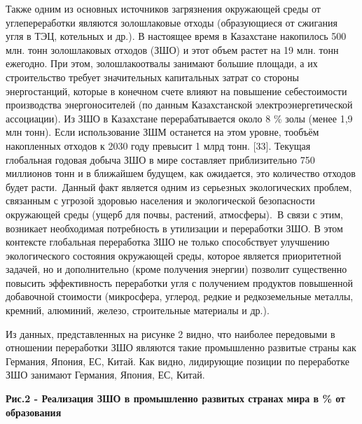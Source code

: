 \begin{multicols}{2}
Также одним из основных источников загрязнения окружающей среды от
углепереработки являются золошлаковые отходы (образующиеся от сжигания
угля в ТЭЦ, котельных и др.). В настоящее время в Казахстане накопилось
500 млн. тонн золошлаковых отходов (ЗШО) и этот объем растет на 19 млн.
тонн ежегодно. При этом, золошлакоотвалы занимают большие площади, а их
строительство требует значительных капитальных затрат со стороны
энергостанций, которые в конечном счете влияют на повышение
себестоимости производства энергоносителей (по данным Казахстанской
электроэнергетической ассоциации). Из ЗШО в Казахстане перерабатывается
около 8 \% золы (менее 1,9 млн тонн). Если использование ЗШМ останется
на этом уровне, тообъём накопленных отходов к 2030 году превысит 1 млрд
тонн. {[}33{]}. Текущая глобальная годовая добыча ЗШО в мире составляет
приблизительно 750 миллионов тонн и в ближайшем будущем, как ожидается,
это количество отходов будет расти.~Данный факт является одним из
серьезных экологических проблем, связанным с угрозой здоровью населения
и экологической безопасности окружающей среды (ущерб для почвы,
растений, атмосферы).~В связи с этим, возникает необходимая потребность
в утилизации и переработки ЗШО. В этом контексте глобальная переработка
ЗШО не только способствует улучшению экологического состояния окружающей
среды, которое является приоритетной задачей, но и дополнительно (кроме
получения энергии) позволит существенно повысить эффективность
переработки угля с получением продуктов повышенной добавочной стоимости
(микросфера, углерод, редкие и редкоземельные металлы, кремний,
алюминий, железо, строительные материалы и др.).

Из данных, представленных на рисунке 2 видно, что наиболее передовыми в
отношении переработки ЗШО являются такие промышленно развитые страны как
Германия, Япония, ЕС, Китай. Как видно, лидирующие позиции по
переработке ЗШО занимают Германия, Япония, ЕС, Китай.
\end{multicols}

{\bfseries Рис.2 - Реализация ЗШО в промышленно развитых странах мира в \%
от образования}

